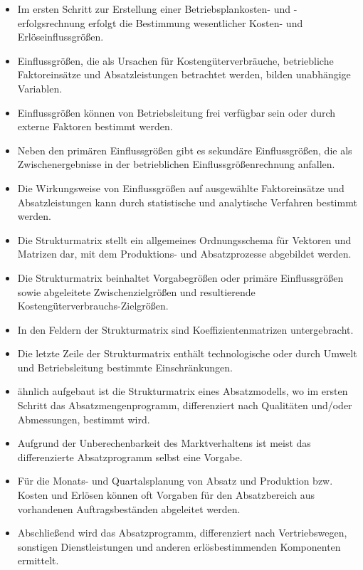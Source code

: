 \begin{itemize}
    \item Im ersten Schritt zur Erstellung einer Betriebsplankosten- und -erfolgsrechnung erfolgt die Bestimmung wesentlicher Kosten- und Erlöseinflussgrö{\ss}en.
    \item Einflussgrö{\ss}en, die als Ursachen für Kostengüterverbräuche, betriebliche Faktoreinsätze und Absatzleistungen betrachtet werden, bilden unabhängige Variablen.
    \item Einflussgrö{\ss}en können von Betriebsleitung frei verfügbar sein oder durch externe Faktoren bestimmt werden.
    \item Neben den primären Einflussgrö{\ss}en gibt es sekundäre Einflussgrö{\ss}en, die als Zwischenergebnisse in der betrieblichen Einflussgrö{\ss}enrechnung anfallen.
    \item Die Wirkungsweise von Einflussgrö{\ss}en auf ausgewählte Faktoreinsätze und Absatzleistungen kann durch statistische und analytische Verfahren bestimmt werden.
    \item Die Strukturmatrix stellt ein allgemeines Ordnungsschema für Vektoren und Matrizen dar, mit dem Produktions- und Absatzprozesse abgebildet werden.
    \item Die Strukturmatrix beinhaltet Vorgabegrö{\ss}en oder primäre Einflussgrö{\ss}en sowie abgeleitete Zwischenzielgrö{\ss}en und resultierende Kostengüterverbrauchs-Zielgrö{\ss}en.
    \item In den Feldern der Strukturmatrix sind Koeffizientenmatrizen untergebracht.
    \item Die letzte Zeile der Strukturmatrix enthält technologische oder durch Umwelt und Betriebsleitung bestimmte Einschränkungen.
    \item ähnlich aufgebaut ist die Strukturmatrix eines Absatzmodells, wo im ersten Schritt das Absatzmengenprogramm, differenziert nach Qualitäten und/oder Abmessungen, bestimmt wird.
    \item Aufgrund der Unberechenbarkeit des Marktverhaltens ist meist das differenzierte Absatzprogramm selbst eine Vorgabe.
    \item Für die Monats- und Quartalsplanung von Absatz und Produktion bzw. Kosten und Erlösen können oft Vorgaben für den Absatzbereich aus vorhandenen Auftragsbeständen abgeleitet werden.
    \item Abschlie{\ss}end wird das Absatzprogramm, differenziert nach Vertriebswegen, sonstigen Dienstleistungen und anderen erlösbestimmenden Komponenten ermittelt.
\end{itemize}

